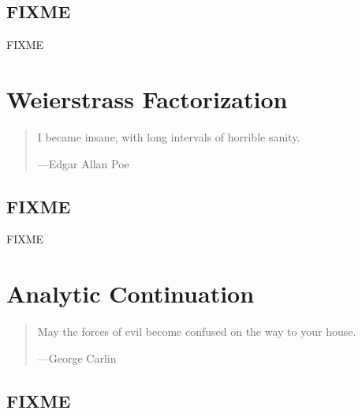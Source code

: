 \documentclass[12pt,openany]{book}
\theoremstyle{plain}
\theoremstyle{remark}
\theoremstyle{definition}
\newenvironment{myquote}{%
    \begin{quote}%
    \begingroup\itshape
}{%
    \endgroup%
    \end{quote}
}
\theoremstyle{exercise}
\theoremstyle{example}
\begin{document}
\section{FIXME}
\label{sec:ratFIXME}

FIXME


\chapter{Weierstrass Factorization} \label{ch:weier}

\begin{myquote}
I became insane, with long intervals of horrible sanity.

---Edgar Allan Poe
\end{myquote}


\section{FIXME}
\label{sec:FIXMEweier}

FIXME


\chapter{Analytic Continuation} \label{ch:analcont}

\begin{myquote}
May the forces of evil become confused on the way to your house.

---George Carlin
\end{myquote}


\section{FIXME}
\label{sec:FIXMEanalcont}
\end{document}
